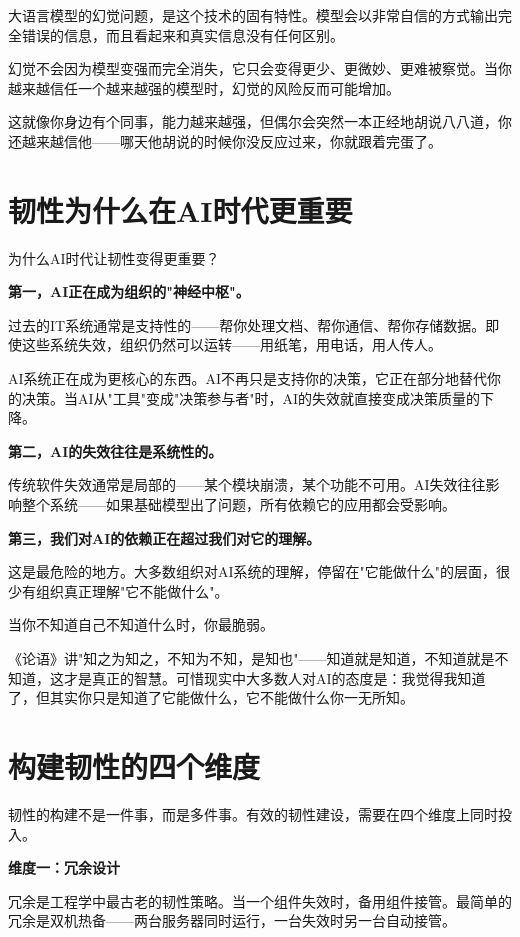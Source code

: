 大语言模型的幻觉问题，是这个技术的固有特性。模型会以非常自信的方式输出完全错误的信息，而且看起来和真实信息没有任何区别。

幻觉不会因为模型变强而完全消失，它只会变得更少、更微妙、更难被察觉。当你越来越信任一个越来越强的模型时，幻觉的风险反而可能增加。

这就像你身边有个同事，能力越来越强，但偶尔会突然一本正经地胡说八八道，你还越来越信他——哪天他胡说的时候你没反应过来，你就跟着完蛋了。

\section{韧性为什么在AI时代更重要}


为什么AI时代让韧性变得更重要？

\textbf{第一，AI正在成为组织的"神经中枢"。}

过去的IT系统通常是支持性的——帮你处理文档、帮你通信、帮你存储数据。即使这些系统失效，组织仍然可以运转——用纸笔，用电话，用人传人。

AI系统正在成为更核心的东西。AI不再只是支持你的决策，它正在部分地替代你的决策。当AI从"工具"变成"决策参与者"时，AI的失效就直接变成决策质量的下降。

\textbf{第二，AI的失效往往是系统性的。}

传统软件失效通常是局部的——某个模块崩溃，某个功能不可用。AI失效往往影响整个系统——如果基础模型出了问题，所有依赖它的应用都会受影响。

\textbf{第三，我们对AI的依赖正在超过我们对它的理解。}

这是最危险的地方。大多数组织对AI系统的理解，停留在"它能做什么"的层面，很少有组织真正理解"它不能做什么"。

当你不知道自己不知道什么时，你最脆弱。

《论语》讲"知之为知之，不知为不知，是知也"——知道就是知道，不知道就是不知道，这才是真正的智慧。可惜现实中大多数人对AI的态度是：我觉得我知道了，但其实你只是知道了它能做什么，它不能做什么你一无所知。

\section{构建韧性的四个维度}


韧性的构建不是一件事，而是多件事。有效的韧性建设，需要在四个维度上同时投入。

\textbf{维度一：冗余设计}

冗余是工程学中最古老的韧性策略。当一个组件失效时，备用组件接管。最简单的冗余是双机热备——两台服务器同时运行，一台失效时另一台自动接管。


